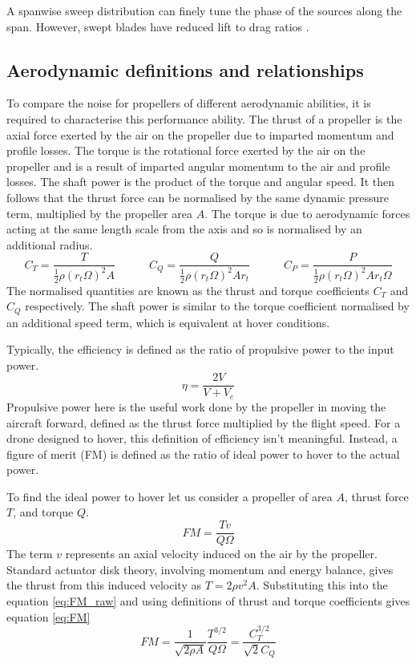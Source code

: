 \documentclass[12pt,a4paper]{article}
\begin{document}
A spanwise sweep distribution can finely tune the phase of the sources along the span.
However, swept blades have reduced lift to drag ratios \cite{Wiedemann_swept}.

\subsection{Aerodynamic definitions and relationships}
To compare the noise for propellers of different aerodynamic abilities, it is required to characterise this performance ability.
The thrust of a propeller is the axial force exerted by the air on the propeller due to imparted momentum and profile losses.
The torque is the rotational force exerted by the air on the propeller and is a result of imparted angular momentum to the air and profile losses.
The shaft power is the product of the torque and angular speed.
It then follows that the thrust force can be normalised by the same dynamic pressure term, multiplied by the propeller area $A$.
The torque is due to aerodynamic forces acting at the same length scale from the axis and so is normalised by an additional radius.
\begin{equation}
    C_T = \frac{T}{\frac{1}{2} \rho (r_t\Omega)^2 A} \quad \quad \quad C_Q = \frac{Q}{\frac{1}{2} \rho (r_t\Omega)^2 A r_t} \quad \quad \quad C_P = \frac{P}{\frac{1}{2} \rho (r_t\Omega)^2 A r_t \Omega} \label{eq:CT_CQ}
\end{equation}
The normalised quantities are known as the thrust and torque coefficients $C_T$ and $C_Q$ respectively.
The shaft power is similar to the torque coefficient normalised by an additional speed term, which is equivalent at hover conditions.


Typically, the efficiency is defined as the ratio of propulsive power to the input power.
\begin{equation}
    \eta = \frac{2 V}{V + V_e}
\end{equation}
Propulsive power here is the useful work done by the propeller in moving the aircraft forward, defined as the thrust force multiplied by the flight speed.
For a drone designed to hover, this definition of efficiency isn't meaningful.
Instead, a figure of merit (FM) is defined as the ratio of ideal power to hover to the actual power.

To find the ideal power to hover let us consider a propeller of area $A$, thrust force $T$, and torque $Q$.
\begin{equation}
    FM = \frac{Tv}{Q \Omega} \label{eq:FM_raw}
\end{equation}
The term $v$ represents an axial velocity induced on the air by the propeller.
Standard actuator disk theory, involving momentum and energy balance, gives the thrust from this induced velocity as $ T = 2 \rho v^2 A$.
Substituting this into the equation \ref{eq:FM_raw} and using definitions of thrust and torque coefficients gives equation \ref{eq:FM}
\begin{equation}
    FM = \frac{1}{ \sqrt{2 \rho A}} \frac{T^{3/2}}{Q \Omega} = \frac{C_T^{3/2}}{\sqrt{2}C_Q} \label{eq:FM}
\end{equation}
\end{document}
